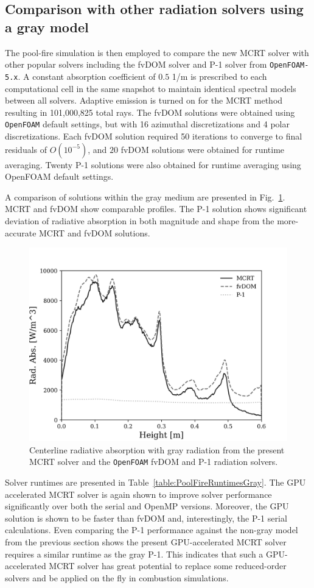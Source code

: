 \subsection{Comparison with other radiation solvers using a gray model}


The pool-fire simulation is then employed to compare the new MCRT solver with other popular solvers including the fvDOM solver and P-1 solver from \texttt{OpenFOAM-5.x}. A constant absorption coefficient of $0.5$ 1/m is prescribed to each computational cell in the same snapshot to maintain identical spectral models between all solvers. 
Adaptive emission is turned on for the MCRT method resulting in 101,000,825 total rays. The fvDOM solutions were obtained using \texttt{OpenFOAM} default settings, but with 16 azimuthal discretizations and 4 polar discretizations. 
Each fvDOM solution required 50 iterations to converge to final residuals of $O(10^{-5})$, and $20$ fvDOM solutions were obtained for runtime averaging. Twenty P-1 solutions were also obtained for runtime averaging using OpenFOAM default settings.

A comparison of solutions within the gray medium are presented in Fig.~\ref{fig:PoolFireVerificationLine2}. MCRT and fvDOM show comparable profiles. The P-1 solution shows significant deviation of radiative absorption in both magnitude and shape from the more-accurate MCRT and fvDOM solutions. 
\begin{figure}[!h]
\centering
\includegraphics[width=0.6\linewidth]{figures/ch4/comparison_verification.png}
\caption{Centerline radiative absorption with gray radiation from the present MCRT solver and the \texttt{OpenFOAM} fvDOM and P-1 radiation solvers.}
\label{fig:PoolFireVerificationLine2}
\end{figure}

Solver runtimes are presented in Table~\ref{table:PoolFireRuntimesGray}. The GPU accelerated MCRT solver is again shown to improve solver performance significantly over both the serial and OpenMP versions. Moreover, the GPU solution is shown to be faster than fvDOM and, interestingly, the P-1 serial calculations. Even comparing the P-1 performance against the non-gray model from the previous section shows the present GPU-accelerated MCRT solver requires a similar runtime as the gray P-1. This indicates that such a GPU-accelerated MCRT solver has great potential to replace some reduced-order solvers and be applied on the fly in combustion simulations.



